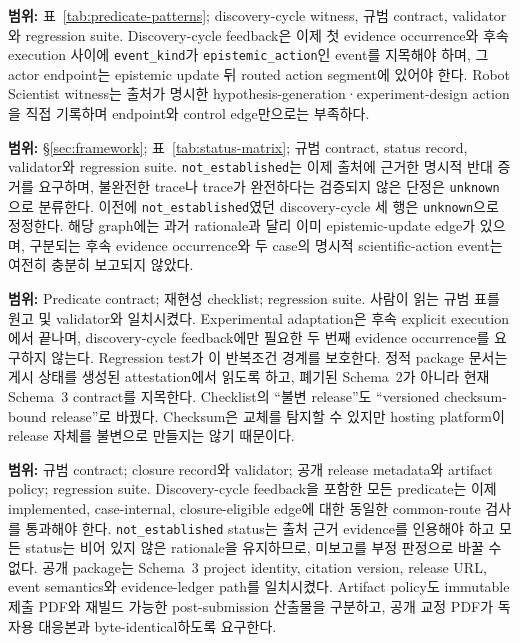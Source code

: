 \documentclass[11pt]{article}
\begin{document}
\begin{description}
  \textbf{범위:} 표~\ref{tab:predicate-patterns}; discovery-cycle witness, 규범 contract, validator와 regression suite.
  Discovery-cycle feedback은 이제 첫 evidence occurrence와 후속 execution 사이에 \texttt{event\_kind}가 \texttt{epistemic\_action}인 event를 지목해야 하며, 그 actor endpoint는 epistemic update 뒤 routed action segment에 있어야 한다. Robot Scientist witness는 출처가 명시한 hypothesis-generation·experiment-design action을 직접 기록하며 endpoint와 control edge만으로는 부족하다.
  \item[R42. Negative-status evidence 경계.]
  \textbf{범위:} §\ref{sec:framework}; 표~\ref{tab:status-matrix}; 규범 contract, status record, validator와 regression suite.
  \texttt{not\_established}는 이제 출처에 근거한 명시적 반대 증거를 요구하며, 불완전한 trace나 trace가 완전하다는 검증되지 않은 단정은 \texttt{unknown}으로 분류한다. 이전에 \texttt{not\_established}였던 discovery-cycle 세 행은 \texttt{unknown}으로 정정한다. 해당 graph에는 과거 rationale과 달리 이미 epistemic-update edge가 있으며, 구분되는 후속 evidence occurrence와 두 case의 명시적 scientific-action event는 여전히 충분히 보고되지 않았다.
  \item[R43. 표현 간 adaptation contract와 release 가변성.]
  \textbf{범위:} Predicate contract; 재현성 checklist; regression suite.
  사람이 읽는 규범 표를 원고 및 validator와 일치시켰다. Experimental adaptation은 후속 explicit execution에서 끝나며, discovery-cycle feedback에만 필요한 두 번째 evidence occurrence를 요구하지 않는다. Regression test가 이 반복조건 경계를 보호한다. 정적 package 문서는 게시 상태를 생성된 attestation에서 읽도록 하고, 폐기된 Schema~2가 아니라 현재 Schema~3 contract를 지목한다. Checklist의 ``불변 release''도 ``versioned checksum-bound release''로 바꿨다. Checksum은 교체를 탐지할 수 있지만 hosting platform이 release 자체를 불변으로 만들지는 않기 때문이다.
  \item[R44. Closure route와 release identity 정합성.]
  \textbf{범위:} 규범 contract; closure record와 validator; 공개 release metadata와 artifact policy; regression suite.
  Discovery-cycle feedback을 포함한 모든 predicate는 이제 implemented, case-internal, closure-eligible edge에 대한 동일한 common-route 검사를 통과해야 한다. \texttt{not\_established} status는 출처 근거 evidence를 인용해야 하고 모든 status는 비어 있지 않은 rationale을 유지하므로, 미보고를 부정 판정으로 바꿀 수 없다. 공개 package는 Schema~3 project identity, citation version, release URL, event semantics와 evidence-ledger path를 일치시켰다. Artifact policy도 immutable 제출 PDF와 재빌드 가능한 post-submission 산출물을 구분하고, 공개 교정 PDF가 독자용 대응본과 byte-identical하도록 요구한다.

\end{description}
\end{document}
